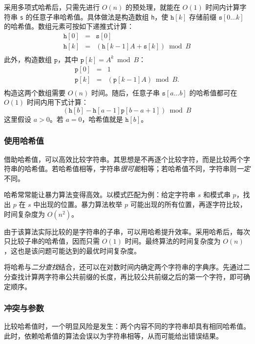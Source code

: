采用多项式哈希后，只需先进行 $O(n)$ 的预处理，就能在 $O(1)$ 时间内计算字符串 \texttt{s} 的任意子串哈希值。具体做法是构造数组 \texttt{h}，使 $\texttt{h}[k]$ 存储前缀 $\texttt{s}[0 \ldots k]$ 的哈希值。数组元素可按如下递推式计算：
\[
\begin{array}{lcl}
\texttt{h}[0] & = & \texttt{s}[0] \\
\texttt{h}[k] & = & (\texttt{h}[k-1] A + \texttt{s}[k]) \bmod B \\
\end{array}
\]
此外，构造数组 $\texttt{p}$，其中 $\texttt{p}[k]=A^k \bmod B$：
\[
\begin{array}{lcl}
\texttt{p}[0] & = & 1 \\
\texttt{p}[k] & = & (\texttt{p}[k-1] A) \bmod B. \\
\end{array}
\]
构造这两个数组需要 $O(n)$ 时间。随后，任意子串 $\texttt{s}[a \ldots b]$ 的哈希值都可在 $O(1)$ 时间内用下式计算：
\[(\texttt{h}[b]-\texttt{h}[a-1] \texttt{p}[b-a+1]) \bmod B\]
这里假设 $a>0$。若 $a=0$，哈希值就是 $\texttt{h}[b]$。

\subsubsection*{使用哈希值}

借助哈希值，可以高效比较字符串。其思想是不再逐个比较字符，而是比较两个字符串的哈希值。若哈希值相等，字符串\emph{很可能}相等；若哈希值不同，字符串则\emph{一定}不同。

哈希常常能让暴力算法变得高效。以模式匹配为例：给定字符串 $s$ 和模式串 $p$，找出 $p$ 在 $s$ 中出现的位置。暴力算法枚举 $p$ 可能出现的所有位置，再逐字符比较，时间复杂度为 $O(n^2)$。

由于该算法实际比较的是字符串的子串，可以用哈希提升效率。采用哈希后，每次只比较子串的哈希值，因而只需 $O(1)$ 时间。最终算法的时间复杂度为 $O(n)$，这也是该问题可能达到的最优时间复杂度。

将哈希与\emph{二分查找}结合，还可以在对数时间内确定两个字符串的字典序。先通过二分查找计算两字符串公共前缀的长度，再比较公共前缀之后的第一个字符，即可确定顺序。

\subsubsection*{冲突与参数}


比较哈希值时，一个明显风险是发生：两个内容不同的字符串却具有相同哈希值。此时，依赖哈希值的算法会误以为字符串相等，从而可能给出错误结果。

